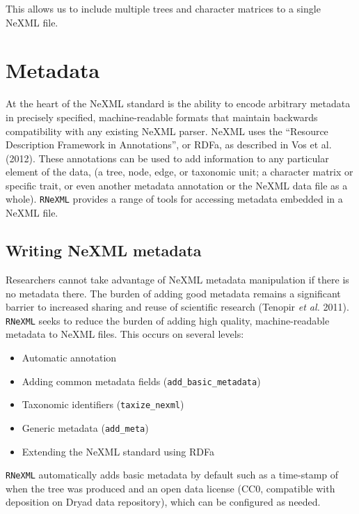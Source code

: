 \documentclass[author-year, review, 11pt]{components/elsarticle} %
\begin{document}
This allows us to include multiple trees and character matrices to a
single NeXML file.

\section{Metadata}\label{metadata}

At the heart of the NeXML standard is the ability to encode arbitrary
metadata in precisely specified, machine-readable formats that maintain
backwards compatibility with any existing NeXML parser. NeXML uses the
``Resource Description Framework in Annotations'', or RDFa, as described
in Vos et al. (2012). These annotations can be used to add information
to any particular element of the data, (a tree, node, edge, or taxonomic
unit; a character matrix or specific trait, or even another metadata
annotation or the NeXML data file as a whole). \texttt{RNeXML} provides
a range of tools for accessing metadata embedded in a NeXML file.

\subsection{Writing NeXML metadata}\label{writing-nexml-metadata}

Researchers cannot take advantage of NeXML metadata manipulation if
there is no metadata there. The burden of adding good metadata remains a
significant barrier to increased sharing and reuse of scientific
research (Tenopir \emph{et al.} 2011). \texttt{RNeXML} seeks to reduce
the burden of adding high quality, machine-readable metadata to NeXML
files. This occurs on several levels:

\begin{itemize}
\itemsep1pt\parskip0pt
\item
  Automatic annotation
\item
  Adding common metadata fields (\texttt{add\_basic\_metadata})
\item
  Taxonomic identifiers (\texttt{taxize\_nexml})
\item
  Generic metadata (\texttt{add\_meta})
\item
  Extending the NeXML standard using RDFa
\end{itemize}

\texttt{RNeXML} automatically adds basic metadata by default such as a
time-stamp of when the tree was produced and an open data license (CC0,
compatible with deposition on Dryad data repository), which can be
configured as needed.
\end{document}
